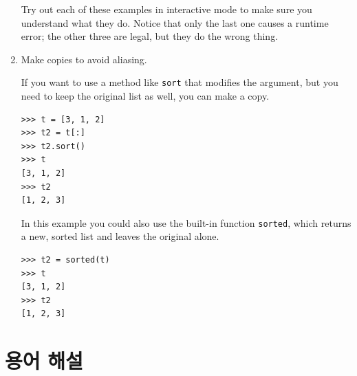 \documentclass[10pt]{book}
\begin{document}
\begin{enumerate}
Try out each of these examples in interactive mode to make sure
you understand what they do.  Notice that only the last
one causes a runtime error; the other three are legal, but they
do the wrong thing.


\item Make copies to avoid aliasing.

If you want to use a method like {\tt sort} that modifies
the argument, but you need to keep the original list as
well, you can make a copy.

\begin{verbatim}
>>> t = [3, 1, 2]
>>> t2 = t[:]
>>> t2.sort()
>>> t
[3, 1, 2]
>>> t2
[1, 2, 3]
\end{verbatim}

In this example you could also use the built-in function {\tt sorted},
which returns a new, sorted list and leaves the original alone.

\begin{verbatim}
>>> t2 = sorted(t)
>>> t
[3, 1, 2]
>>> t2
[1, 2, 3]
\end{verbatim}

\end{enumerate}



\section{용어 해설}
\end{document}
